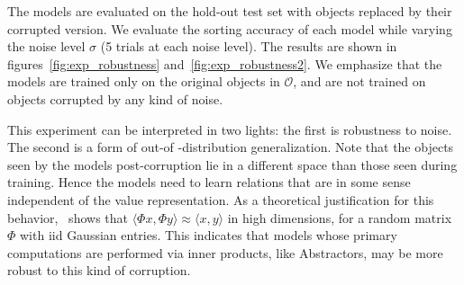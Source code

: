The models are evaluated on the hold-out test set with objects replaced by their corrupted version. We evaluate the sorting accuracy of each model while varying the noise level $\sigma$ (5 trials at each noise level). The results are shown in figures~\ref{fig:exp_robustness} and~\ref{fig:exp_robustness2}. We emphasize that the models are trained only on the original objects in $\mathcal{O}$, and are not trained on objects corrupted by any kind of noise.

This experiment can be interpreted in two lights: the first is robustness to noise. The second is a form of out-of
-distribution generalization. Note that the objects seen by the models post-corruption lie in a different space than
those seen during training. Hence the models need to learn relations that
are in some sense independent of the value representation.
As a theoretical justification for this behavior,~\cite{zhouCompressedPrivacySensitive2009} shows that $\langle \Phi x, \Phi y \rangle \approx \langle x, y \rangle$ in high dimensions, for a random matrix $\Phi$ with iid Gaussian entries. This indicates that models whose primary computations are performed via inner products, like Abstractors, may be more robust to this kind of corruption.
